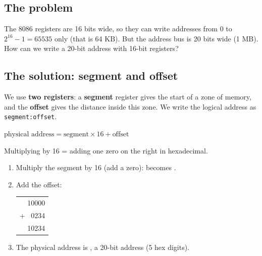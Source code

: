 \subsection{The problem}
The 8086 registers are 16 bits wide, so they can write addresses from 0 to $2^{16} - 1 = 65535$ only
(that is 64 KB). But the address bus is 20 bits wide (1 MB). How can we write a 20-bit address with 16-bit registers?

\subsection{The solution: segment and offset}
We use \textbf{two registers}: a \textbf{segment} register gives the start of a zone of memory, and the
\textbf{offset} gives the distance inside this zone. We write the logical address as \texttt{segment:offset}.

\begin{tarif}
    \centering
    $\text{physical address} = \text{segment} \times 16 + \text{offset}$
    \par\small
    Multiplying by 16 = adding one zero on the right in hexadecimal.
\end{tarif}

\begin{khatwa}[: the physical address for CS = 1000H and IP = 0234H]
    \begin{enumerate}
        \item Multiply the segment by 16 (add a zero):  becomes .
        \item Add the offset:
        \begin{center}
        {\codefont
        \begin{tabular}{r}
              10000 \\
            + \ 0234 \\ \hline
              10234
        \end{tabular}}
        \end{center}
        \item The physical address is , a 20-bit address (5 hex digits).
    \end{enumerate}
\end{khatwa}

